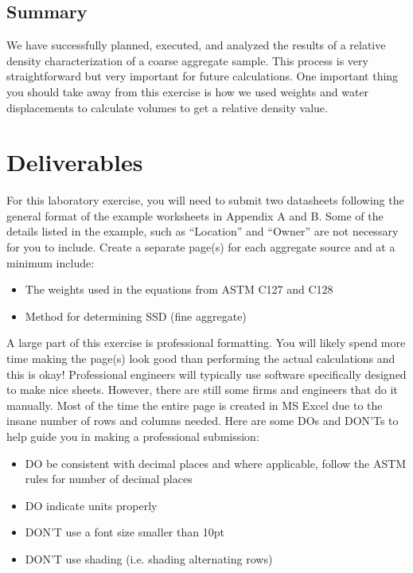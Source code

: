 \documentclass[12pt]{article}
\begin{document}
\subsection{Summary}
We have successfully planned, executed, and analyzed the results of a relative density characterization of a coarse aggregate sample. This process is very straightforward but very important for future calculations. One important thing you should take away from this exercise is how we used weights and water displacements to calculate volumes to get a relative density value. 
\pagebreak
\section{Deliverables}
For this laboratory exercise, you will need to submit two datasheets following the general format of the example worksheets in Appendix A and B. Some of the details listed in the example, such as ``Location'' and ``Owner'' are not necessary for you to include. Create a separate page(s) for each aggregate source and at a minimum include:
\begin{itemize}
    \item The weights used in the equations from ASTM C127 and C128
    \item Method for determining SSD (fine aggregate)
\end{itemize}

A large part of this exercise is professional formatting. You will likely spend more time making the page(s) look good than performing the actual calculations and this is okay! Professional engineers will typically use software specifically designed to make nice sheets. However, there are still some firms and engineers that do it manually. Most of the time the entire page is created in MS Excel due to the insane number of rows and columns needed. Here are some DOs and DON'Ts to help guide you in making a professional submission:

\begin{itemize}
    \item DO be consistent with decimal places and where applicable, follow the ASTM rules for number of decimal places
    \item DO indicate units properly
    \item DON'T use a font size smaller than 10pt
    \item DON'T use shading (i.e. shading alternating rows)
\end{itemize}

%
%
\end{document}
